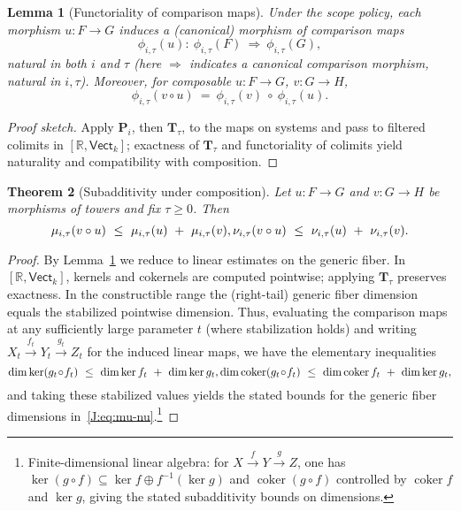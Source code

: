 \documentclass[11pt]{article}
\numberwithin{equation}{section}
\newtheorem{theorem}{Theorem}[section]
\newtheorem{lemma}[theorem]{Lemma}
\theoremstyle{definition}
\providecommand{\n}{\unskip\space}
\begin{document}
\begin{lemma}[Functoriality of comparison maps]\label{J:lem:functoriality}
Under the scope policy, each morphism \(u:F\to G\) induces a (canonical) morphism of comparison maps
\[
\phi_{i,\tau}(u):\ \phi_{i,\tau}(F)\ \Longrightarrow\ \phi_{i,\tau}(G),
\]
natural in both \(i\) and \(\tau\) (here \(\Longrightarrow\) indicates a canonical comparison morphism, natural in \(i,\tau\)).
Moreover, for composable \(u:F\to G\), \(v:G\to H\),
\[
\phi_{i,\tau}(v\circ u)\ =\ \phi_{i,\tau}(v)\ \circ\ \phi_{i,\tau}(u).
\]
\end{lemma}

\begin{proof}[Proof sketch]
Apply \(\mathbf{P}_i\), then \(\mathbf{T}_\tau\), to the maps on systems and pass to filtered colimits in \([\mathbb{R},\mathsf{Vect}_k]\); exactness of \(\mathbf{T}_\tau\) and functoriality of colimits yield naturality and compatibility with composition.
\end{proof}

\begin{theorem}[Subadditivity under composition]\label{J:thm:subadd}
Let \(u:F\to G\) and \(v:G\to H\) be morphisms of towers and fix \(\tau\ge 0\).
Then
\[
\mu_{i,\tau}(v\circ u)\ \le\ \mu_{i,\tau}(u)\ +\ \mu_{i,\tau}(v),\qquad\n\nu_{i,\tau}(v\circ u)\ \le\ \nu_{i,\tau}(u)\ +\ \nu_{i,\tau}(v).
\]
\end{theorem}

\begin{proof}
By Lemma~\ref{J:lem:functoriality} we reduce to linear estimates on the generic fiber.
In \([\mathbb{R},\mathsf{Vect}_k]\), kernels and cokernels are computed pointwise; applying \(\mathbf{T}_\tau\) preserves exactness.
In the constructible range the (right-tail) generic fiber dimension equals the stabilized pointwise dimension.
Thus, evaluating the comparison maps at any sufficiently large parameter \(t\) (where stabilization holds) and writing \(X_t\xrightarrow{f_t}Y_t\xrightarrow{g_t}Z_t\) for the induced linear maps, we have the elementary inequalities
\[
\dim\ker(g_t\!\circ\! f_t)\ \le\ \dim\ker f_t\ +\ \dim\ker g_t,\qquad\n\dim\operatorname{coker}(g_t\!\circ\! f_t)\ \le\ \dim\operatorname{coker} f_t\ +\ \dim\ker g_t,
\]
and taking these stabilized values yields the stated bounds for the generic fiber dimensions in~\eqref{J:eq:mu-nu}.\footnote{Finite-dimensional linear algebra: for \(X\xrightarrow{f}Y\xrightarrow{g}Z\), one has \(\ker(g\!\circ\! f)\subseteq \ker f \oplus f^{-1}(\ker g)\) and \(\operatorname{coker}(g\!\circ\! f)\) controlled by \(\operatorname{coker} f\) and \(\ker g\), giving the stated subadditivity bounds on dimensions.}
\end{proof}
\end{document}

